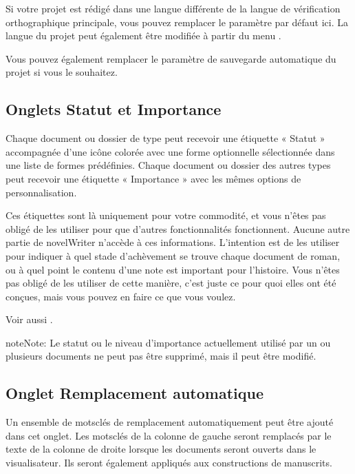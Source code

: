 \documentclass[a4paper,11pt,french]{sphinxmanual}
\begin{document}
\sphinxAtStartPar
Si votre projet est rédigé dans une langue différente de la langue de vérification orthographique principale, vous pouvez remplacer le paramètre par défaut ici. La langue du projet peut également être modifiée à partir du menu .

\sphinxAtStartPar
Vous pouvez également remplacer le paramètre de sauvegarde automatique du projet si vous le souhaitez.


\subsection{Onglets Statut et Importance}
\label{\detokenize{project_overview:status-and-importance-tabs}}
\sphinxAtStartPar
Chaque document ou dossier de type  peut recevoir une étiquette « Statut » accompagnée d’une icône colorée avec une forme optionnelle sélectionnée dans une liste de formes prédéfinies. Chaque document ou dossier des autres types peut recevoir une étiquette « Importance » avec les mêmes options de personnalisation.

\sphinxAtStartPar
Ces étiquettes sont là uniquement pour votre commodité, et vous n’êtes pas obligé de les utiliser pour que d’autres fonctionnalités fonctionnent. Aucune autre partie de novelWriter n’accède à ces informations. L’intention est de les utiliser pour indiquer à quel stade d’achèvement se trouve chaque document de roman, ou à quel point le contenu d’une note est important pour l’histoire. Vous n’êtes pas obligé de les utiliser de cette manière, c’est juste ce pour quoi elles ont été conçues, mais vous pouvez en faire ce que vous voulez.

\sphinxAtStartPar
Voir aussi {\hyperref[\detokenize{usage_project:a-ui-tree-status}]{}}.

\begin{sphinxadmonition}{note}{Note:}
\sphinxAtStartPar
Le statut ou le niveau d’importance actuellement utilisé par un ou plusieurs documents ne peut pas être supprimé, mais il peut être modifié.
\end{sphinxadmonition}


\subsection{Onglet Remplacement automatique}
\label{\detokenize{project_overview:auto-replace-tab}}
\sphinxAtStartPar
Un ensemble de mots\sphinxhyphen{}clés de remplacement automatiquement peut être ajouté dans cet onglet. Les mots\sphinxhyphen{}clés de la colonne de gauche seront remplacés par le texte de la colonne de droite lorsque les documents seront ouverts dans le visualisateur. Ils seront également appliqués aux constructions de manuscrits.
\end{document}
